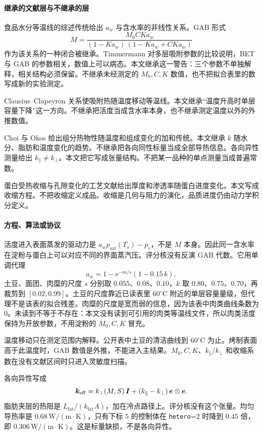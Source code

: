 \paragraph{继承的文献层与不继承的层}
食品水分等温线的综述传统给出 $a_w$ 与含水率的非线性关系。GAB 形式
\[
M=\frac{M_0 C K a_w}{(1-K a_w)\,(1-K a_w+C K a_w)}
\]
作为该关系的一种闭合被继承\cite{gab1980,sorption2026}。Timmermann 对多层吸附参数的比较说明，BET 与 GAB 的参数相关，数值上可以病态\cite{gab1980}。本文继承这一警告：三个参数不单独解释，相关结构必须保留。不继承未经测定的 $M_0,C,K$ 数值，也不把拟合表里的数写成新的实验测定。

Clausius–Clapeyron 关系使吸附热随温度移动等温线。本文继承“温度升高时单层容量下降”这一方向。不继承把活度当成含水率本身，也不继承测定温度以外的外推数值。

Choi 与 Okos 给出组分热物性随温度和组成变化的加和传统\cite{choi1986}。本文继承 $k$ 随水分、脂肪和温度变化的趋势。不继承把各向同性标量当成全部导热信息。各向异性测量给出 $k_\parallel\neq k_\perp$。本文把它写成张量结构。不把某一品种的单点测量当成普遍常数。

蛋白受热收缩与孔隙变化的工艺文献给出厚度和渗透率随蛋白进度变化。本文写成收缩方程。不把收缩定义成品。收缩是几何与阻力的演化，品质进度仍由动力学积分定义。

\paragraph{方程、算法或协议}
活度进入表面蒸发的驱动力是 $a_w p_{\mathrm{sat}}(T_s)-p_v$，不是 $M$ 本身。因此同一含水率在淀粉与蛋白上可以对应不同的界面蒸汽压。评分核没有反演 GAB 代数。它用单调代理
\[
a_w=1-\mathrm{e}^{-m/s}(1-0.15\,k),
\]
土豆、面团、肉糜的尺度 $s$ 分别取 $0.055$、$0.08$、$0.10$，$k$ 取 $0.80$、$0.75$、$0.70$，再裁剪到 $[0.02,0.99]$。土豆的尺度靠近已读表里 $60^\circ\mathrm{C}$ 附近的单层容量量级，但代理不是该表的拟合残差。肉糜的尺度是宽而弱的信息，因为该表中肉类曲线条数为 $0$。未读到不等于不存在：本文没有读到可引用的肉类等温线文件，所以肉类活度保持为开放参数，不用淀粉的 $M_0,C,K$ 冒充。

温度移动只在测定范围内解释。公开表中土豆的清洁曲线到 $60^\circ\mathrm{C}$ 为止。烤制表面高于此温度时，GAB 数值是外推，不能进入主结果。$M_0,C,K$、$k_\parallel/k_\perp$ 和收缩系数在没有文献区间时只进入灵敏度扫描。

各向异性写成
\[
\bm{k}_{\mathrm{eff}}=k_\perp(M,S)\,\bm{I}+(k_\parallel-k_\perp)\,\bm{e}\otimes\bm{e}.
\]
脂肪夹层的热阻是 $L_{\mathrm{fat}}/(k_{\mathrm{fat}}A)$，加在冷点路径上。评分核没有这个张量。均匀导热率是 $0.68\,\mathrm{W/(m\cdot K)}$，只有下标 $5$ 的控制体在 \texttt{hetero}=2 时降到 $0.45$ 倍，即 $0.306\,\mathrm{W/(m\cdot K)}$。这是标量缺损，不是各向异性。

